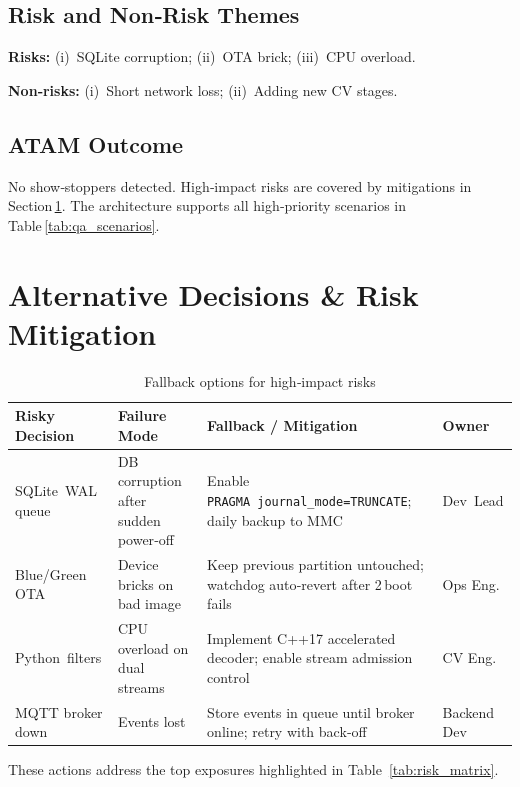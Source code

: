 \documentclass[11pt,a4paper]{article}
\begin{document}
\subsection{Risk and Non‑Risk Themes}
\textbf{Risks:}
(i) SQLite corruption; (ii) OTA brick; (iii) CPU overload.  

\textbf{Non‑risks:}
(i) Short network loss; (ii) Adding new CV stages.

\subsection{ATAM Outcome}
No show‑stoppers detected. High‑impact risks are covered by mitigations in Section \ref{sec:alt_risk}. The architecture supports all high‑priority scenarios in Table \ref{tab:qa_scenarios}.

\section{Alternative Decisions \& Risk Mitigation}
\label{sec:alt_risk}

\begin{table}[h!]
\centering
\setlength{\extrarowheight}{2pt}
\begin{tabular}{|p{2.8cm}|p{3.4cm}|p{3.8cm}|p{2.8cm}|}
\hline
\textbf{Risky Decision} & \textbf{Failure Mode} & \textbf{Fallback / Mitigation} & \textbf{Owner} \\ \hline
SQLite WAL queue & DB corruption after sudden power‑off & Enable \texttt{PRAGMA journal\_mode=TRUNCATE}; daily backup to MMC & Dev Lead \\ \hline
Blue/Green OTA & Device bricks on bad image & Keep previous partition untouched; watchdog auto‑revert after 2 boot fails & Ops Eng. \\ \hline
Python filters & CPU overload on dual streams & Implement C++17 accelerated decoder; enable stream admission control & CV Eng. \\ \hline
MQTT broker down & Events lost & Store events in queue until broker online; retry with back‑off & Backend Dev \\ \hline
\end{tabular}
\caption{Fallback options for high‑impact risks}
\label{tab:fallbacks}
\end{table}
These actions address the top exposures highlighted in Table \ref{tab:risk_matrix}.
\end{document}
